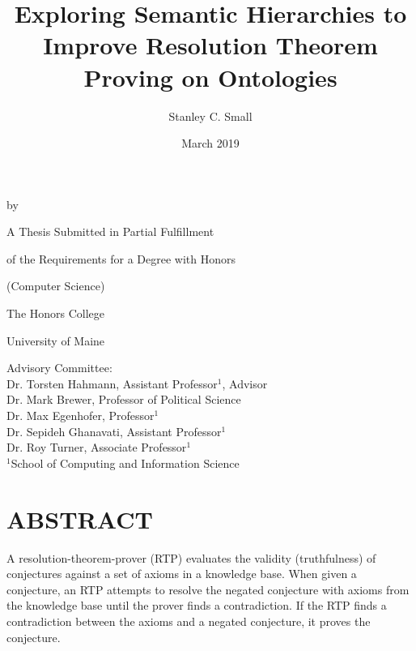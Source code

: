 \documentclass{article}
\title{Exploring Semantic Hierarchies to Improve Resolution Theorem Proving on Ontologies}
\author{Stanley C. Small}
\date{March 2019}
\begin{document}
\begin{titlepage}
	\makeatletter
		\begin{center}
   				\MakeUppercase{\@title} \par
  				\smallskip 
 				\vspace{.15in} by \par
 				\smallskip
  				\vspace{.15in} \@author \par
  				\vspace{1in}
 				A Thesis Submitted in Partial Fulfillment  \par
  				of the Requirements for a Degree with Honors \par
  				(Computer Science) \par
  				\vspace{.75in}
  				The Honors College \par
  				University of Maine \par
  				\@date \par
 				\vfill
   		\end{center}
	\makeatother
	\begin{flushleft}
		Advisory Committee: \\
		\hspace{.3in} Dr. Torsten Hahmann, Assistant Professor$^{1}$, Advisor \\
		\hspace{.3in} Dr. Mark Brewer, Professor of Political Science \\
		\hspace{.3in} Dr. Max Egenhofer, Professor$^{1}$ \\
		\hspace{.3in} Dr. Sepideh Ghanavati, Assistant Professor$^{1}$ \\
		\hspace{.3in} Dr. Roy Turner, Associate Professor$^{1}$ \\
		\hfill \break
		\hspace{.3in} $^{1}$School of Computing and Information Science
	\end{flushleft}
\end{titlepage}

\newpage
{}
\vspace*{.05in}
\section*{\MakeUppercase{Abstract}}
A resolution-theorem-prover (RTP) evaluates the validity (truthfulness) of conjectures against a set of axioms in a knowledge base. When given a conjecture, an RTP attempts to resolve the negated conjecture with axioms from the knowledge base until the prover finds a contradiction. If the RTP finds a contradiction between the axioms and a negated conjecture, it proves the conjecture. 
\end{document}
